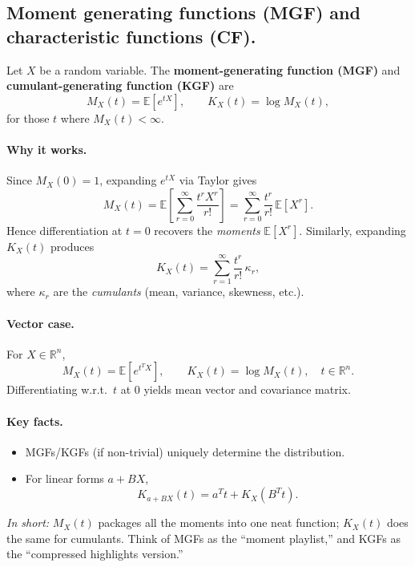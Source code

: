 \subsection*{Moment generating functions (MGF) and characteristic functions (CF).}
Let $X$ be a random variable. The \textbf{moment-generating function (MGF)} and \textbf{cumulant-generating function (KGF)} are
\[
M_X(t) = \mathbb{E}[e^{tX}], 
\qquad 
K_X(t) = \log M_X(t),
\]
for those $t$ where $M_X(t)<\infty$.

\paragraph{Why it works.} Since $M_X(0)=1$, expanding $e^{tX}$ via Taylor gives
\[
M_X(t) = \mathbb{E}\!\left[\sum_{r=0}^\infty \frac{t^r X^r}{r!}\right]
= \sum_{r=0}^\infty \frac{t^r}{r!}\,\mathbb{E}[X^r].
\]
Hence differentiation at $t=0$ recovers the \emph{moments} $\mathbb{E}[X^r]$. Similarly, expanding $K_X(t)$ produces
\[
K_X(t) = \sum_{r=1}^\infty \frac{t^r}{r!}\,\kappa_r,
\]
where $\kappa_r$ are the \emph{cumulants} (mean, variance, skewness, etc.).

\paragraph{Vector case.} For $X\in\mathbb{R}^n$,
\[
M_X(t)=\mathbb{E}[e^{t^T X}], 
\qquad 
K_X(t)=\log M_X(t), \quad t\in\mathbb{R}^n.
\]
Differentiating w.r.t.\ $t$ at $0$ yields mean vector and covariance matrix.

\paragraph{Key facts.}
\begin{itemize}
\item MGFs/KGFs (if non-trivial) uniquely determine the distribution.
\item For linear forms $a+BX$, 
\[
K_{a+BX}(t)=a^T t + K_X(B^T t).
\]
\end{itemize}

\textit{In short:} $M_X(t)$ packages all the moments into one neat function; $K_X(t)$ does the same for cumulants. Think of MGFs as the “moment playlist,” and KGFs as the “compressed highlights version.”
